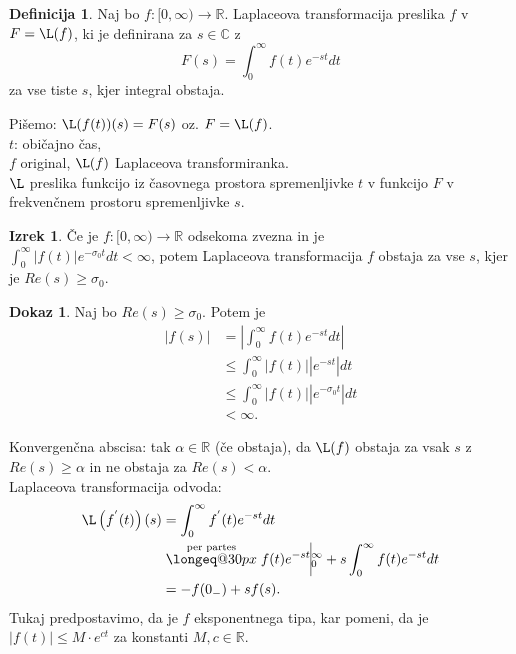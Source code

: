 \documentclass[a4paper, 12pt]{book}
\makeatletter
\theoremstyle{definition}
\newtheorem{defn}[counter]{Definicija}
\newtheorem{theorem}[counter]{Izrek}
\newtheorem{pro}[counter]{Dokaz}
\theoremstyle{remark}
\newcommand{\R}{\mathbb{R}}
\newcommand{\C}{\mathbb{C}}
\newcommand{\longeq}[1]{\mathrel{\mathpalette\longeq@{#1}}}
\newcommand{\longeq@}[2]{%
  \begingroup
  \sbox\z@{$\m@th#1=$}%
  \ifdim#2<\wd\z@
    \resizebox{#2}{\height}{\box\z@}%
  \else
    \ifdim#2<3\wd\z@
      \hbox to #2{$\m@th#1=\hss=\hss=\hss=$}%
    \else
      \hbox to #2{$\m@th#1=\cleaders\hbox to 0.2\wd\z@{\hss$#1=$\hss}\hfil=$}%
    \fi
  \fi
  \endgroup
}
\makeatother
\begin{document}
\begin{defn}
    Naj bo $f: [0, \infty) \to \R$.
    Laplaceova transformacija preslika $f$ v $F = \L(f)$, ki je definirana za $s \in \C$ z
    \begin{equation*}
        F(s) = \int_0^{\infty} f(t) e^{-st} dt
    \end{equation*}
    za vse tiste $s$, kjer integral obstaja.
\end{defn}
Pišemo: $\L(f(t))(s) = F(s)$ oz. $F = \L(f)$. \\
$t$: običajno čas, \\
$f$ original, $\L(f)$ Laplaceova transformiranka. \\
$\L$ preslika funkcijo iz časovnega prostora spremenljivke $t$ v funkcijo $F$
v frekvenčnem prostoru spremenljivke $s$.
\begin{theorem}
    Če je $f: [0, \infty) \to \R$ odsekoma zvezna in je \\
    $\int_0^{\infty} |f(t)| e^{-\sigma_0 t} dt < \infty$,
    potem Laplaceova transformacija $f$ obstaja za vse $s$, kjer je $Re(s) \geq \sigma_0$.
\end{theorem}
\begin{pro}
    Naj bo $Re(s) \geq \sigma_0$. Potem je
    \begin{align*}
        |f(s)| &= \left| \int_0^{\infty} f(t) e^{-st} dt \right| \\
        &\leq  \int_0^{\infty} |f(t)| \left| e^{-st} \right| dt \\
        &\leq  \int_0^{\infty} |f(t)| \left| e^{-\sigma_0 t} \right| dt \\
        &< \infty.
    \end{align*}
\end{pro}
Konvergenčna abscisa: tak $\alpha \in \R$ (če obstaja), da $\L(f)$ obstaja za vsak $s$ z
$Re(s) \geq \alpha$ in ne obstaja za $Re(s) < \alpha$. \\
Laplaceova transformacija odvoda:
\begin{align*}
    \L\left(f^{'}(t)\right)(s) &= \int_{0}^{\infty} f^{'}(t) e^{-st} dt \\
    &\stackrel{\text{per partes}}{\longeq{30px}} f(t) e^{-st} \vline_{0}^{\infty} +
    s \int_0^{\infty} f(t) e^{-st} dt \\
    &= -f(0_-) + s f(s).
\end{align*}
Tukaj predpostavimo, da je $f$ eksponentnega tipa, kar pomeni, da je \\
$|f(t)| \leq M \cdot e^{ct}$ za konstanti $M, c \in \R$. \\
\end{document}
